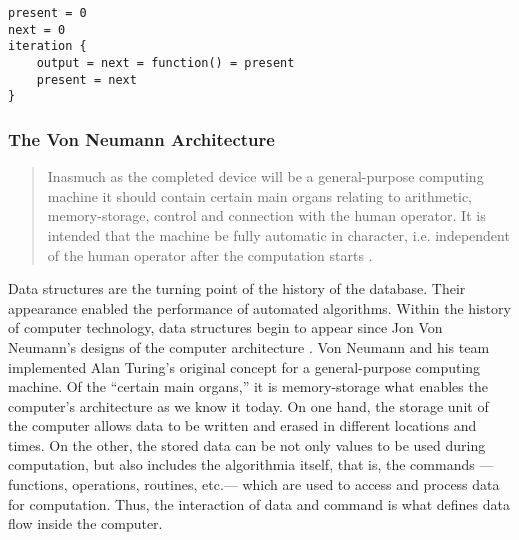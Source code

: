 \begin{flushleft}
\small
\begin{lstlisting}[caption={Pseudocode showing a routine whose next value depends on the present value.},captionpos=b,label={lst:neumann}]
present = 0
next = 0
iteration {
	output = next = function() = present
	present = next
}
\end{lstlisting}
\end{flushleft}


\subsubsection{The Von Neumann Architecture}

\begin{quote}
	Inasmuch as the completed device will be a general-purpose computing machine it should contain certain main organs relating to arithmetic, memory-storage, control and connection with the human operator. It is intended that the machine be fully automatic in character, i.e. independent of the human operator after the computation starts \parencite[1]{von46:Pre}.
\end{quote}

Data structures are the turning point of the history of the database. Their appearance enabled the performance of automated algorithms. Within the history of computer technology, data structures begin to appear since Jon Von Neumann's designs of the computer architecture \parencite{von46:Pre}. Von Neumann and his team implemented Alan Turing's original concept for a general-purpose computing machine. Of the ``certain main organs,'' it is memory-storage what enables the computer's architecture as we know it today. On one hand, the storage unit of the computer allows data to be written and erased in different locations and times. On the other, the stored data can be not only values to be used during computation, but also includes the algorithmia itself, that is, the commands ---functions, operations, routines, etc.--- which are used to access and process data for computation. Thus, the interaction of data and command is what defines data flow inside the computer.

